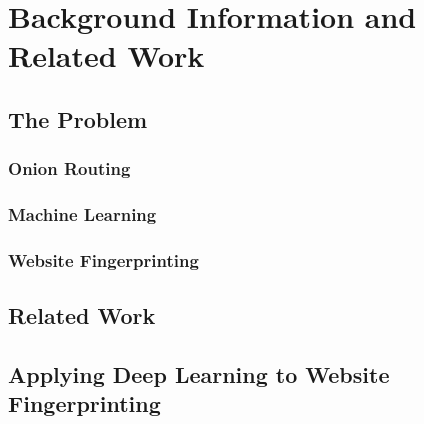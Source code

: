 \section{Background Information and Related Work}

\subsection{The Problem}
\subsubsection{Onion Routing}

\subsubsection{Machine Learning}

\subsubsection{Website Fingerprinting}

\subsection{Related Work}

\subsection{Applying Deep Learning to Website Fingerprinting}
